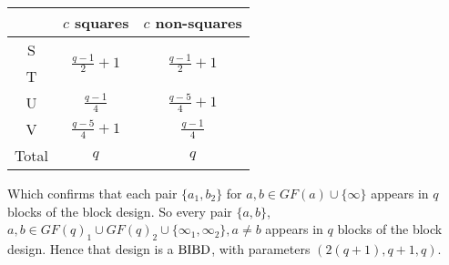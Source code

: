 \begin{center}
\begin{tabular}{c|cc}
       & $c$ squares & $c$ non-squares \\ \hline
 S     & \multirow{2}{*}{$\frac{q - 1}{2} + 1$} & \multirow{2}{*}{$\frac{q - 1}{2} + 1$}                                  \\
 T     &                       &                       \\
 U     & $\frac{q - 1}{4}$     & $\frac{q - 5}{4} + 1$ \\
 V     & $\frac{q - 5}{4} + 1$ & $\frac{q - 1}{4}$     \\ \hline
 Total &        $q$            &      $q$
\end{tabular}
\end{center}

Which confirms that each pair $\{a_1, b_2\}$ for $a, b \in GF(a) \cup \{\infty\}$ appears in $q$ blocks of the block design.
So every pair $\{a, b\}$, $a, b \in GF(q)_1 \cup GF(q)_2 \cup \{\infty _1, \infty _2\}, a \neq b$ appears in $q$ blocks of the block design. Hence that design is a $\operatorname{BIBD}$, with parameters $(2(q + 1), q + 1, q)$.
